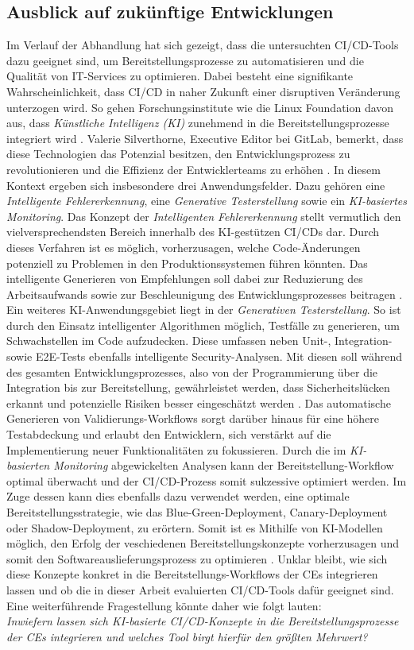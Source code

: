 \subsection{Ausblick auf zukünftige Entwicklungen}

Im Verlauf der Abhandlung hat sich gezeigt, dass die untersuchten CI/CD-Tools  dazu geeignet sind, um Bereitstellungsprozesse zu automatisieren und die Qualität von IT-Services zu optimieren. Dabei besteht eine signifikante Wahrscheinlichkeit, dass CI/CD in naher Zukunft einer disruptiven Veränderung unterzogen wird. So gehen Forschungsinstitute wie die Linux Foundation davon aus, dass \textit{Künstliche Intelligenz (\acs{KI})} zunehmend in die Bereitstellungsprozesse integriert wird \cite{Foundation.2022}. Valerie Silverthorne, Executive Editor bei GitLab, bemerkt, dass diese Technologien das Potenzial besitzen, den Entwicklungsprozess zu revolutionieren und die Effizienz der Entwicklerteams zu erhöhen \cite{.20230415}. In diesem Kontext ergeben sich insbesondere drei Anwendungsfelder. Dazu gehören eine \textit{Intelligente Fehlererkennung}, eine \textit{Generative Testerstellung} sowie ein \textit{KI-basiertes Monitoring}. Das Konzept der \textit{Intelligenten Fehlererkennung} stellt vermutlich den vielversprechendsten Bereich innerhalb des KI-gestützen CI/CDs dar. Durch dieses Verfahren ist es möglich, vorherzusagen, welche Code-Änderungen potenziell zu Problemen in den Produktionssystemen führen könnten. Das intelligente Generieren von Empfehlungen soll dabei zur Reduzierung des Arbeitsaufwands sowie zur Beschleunigung des Entwicklungsprozesses beitragen \cite{.20230415}. Ein weiteres KI-Anwendungsgebiet liegt in der \textit{Generativen Testerstellung}. So ist durch den Einsatz intelligenter Algorithmen möglich, Testfälle zu generieren, um Schwachstellen im Code aufzudecken. Diese umfassen neben Unit-, Integration- sowie E2E-Tests ebenfalls intelligente Security-Analysen. Mit diesen soll  während des gesamten Entwicklungsprozesses, also von der Programmierung über die Integration bis zur Bereitstellung, gewährleistet werden, dass Sicherheitslücken erkannt und potenzielle Risiken besser eingeschätzt werden \cite{Exterman.2022}. Das automatische Generieren von Validierungs-Workflows sorgt darüber hinaus für eine höhere Testabdeckung und erlaubt den Entwicklern, sich verstärkt auf die Implementierung neuer Funktionalitäten zu fokussieren. Durch die im \textit{KI-basierten Monitoring} abgewickelten Analysen kann der Bereitstellung-Workflow optimal überwacht und der CI/CD-Prozess somit sukzessive optimiert werden. Im Zuge dessen kann dies ebenfalls dazu verwendet werden, eine optimale Bereitstellungsstrategie, wie das Blue-Green-Deployment, Canary-Deployment oder Shadow-Deployment, zu erörtern. Somit ist es Mithilfe von KI-Modellen möglich, den Erfolg der veschiedenen Bereitstellungskonzepte vorherzusagen und somit den Softwareauslieferungsprozess zu optimieren \cite{Exterman.2022}. Unklar bleibt, wie sich diese Konzepte konkret in die Bereitstellungs-Workflows der CEs integrieren lassen und ob die in dieser Arbeit evaluierten CI/CD-Tools dafür geeignet sind. Eine weiterführende Fragestellung könnte daher wie folgt lauten:\\
\textit{Inwiefern lassen sich KI-basierte CI/CD-Konzepte in die Bereitstellungsprozesse der CEs integrieren und welches Tool birgt hierfür den größten Mehrwert?}
